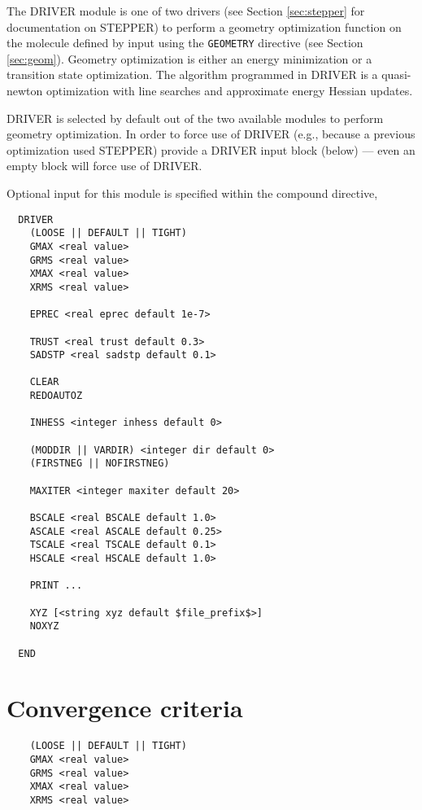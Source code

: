 \label{sec:driver}

The DRIVER module is one of two drivers (see Section \ref{sec:stepper}
for documentation on STEPPER) to perform a geometry optimization
function on the molecule defined by input using the \verb+GEOMETRY+
directive (see Section \ref{sec:geom}).  Geometry optimization is
either an energy minimization or a transition state optimization.
The algorithm programmed in DRIVER is a quasi-newton optimization
with line searches and approximate energy Hessian updates.

DRIVER is selected by default out of the two available modules to
perform geometry optimization.  In order to force use of DRIVER (e.g.,
because a previous optimization used STEPPER) provide a DRIVER input
block (below) --- even an empty block will force use of DRIVER.

Optional input for this module is specified within the compound
directive,
\begin{verbatim}
  DRIVER 
    (LOOSE || DEFAULT || TIGHT)
    GMAX <real value>
    GRMS <real value>
    XMAX <real value>
    XRMS <real value>

    EPREC <real eprec default 1e-7>

    TRUST <real trust default 0.3>
    SADSTP <real sadstp default 0.1>

    CLEAR
    REDOAUTOZ

    INHESS <integer inhess default 0>

    (MODDIR || VARDIR) <integer dir default 0>
    (FIRSTNEG || NOFIRSTNEG)

    MAXITER <integer maxiter default 20>

    BSCALE <real BSCALE default 1.0>
    ASCALE <real ASCALE default 0.25>
    TSCALE <real TSCALE default 0.1>
    HSCALE <real HSCALE default 1.0>
   
    PRINT ...

    XYZ [<string xyz default $file_prefix$>]
    NOXYZ

  END
\end{verbatim}

\sloppy

\section{Convergence criteria}

\begin{verbatim}
    (LOOSE || DEFAULT || TIGHT)
    GMAX <real value>
    GRMS <real value>
    XMAX <real value>
    XRMS <real value>
\end{verbatim}

